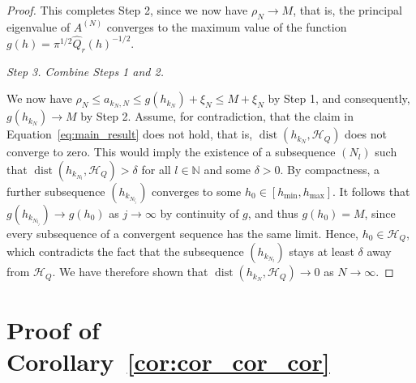 \begin{proof}
    This completes Step 2, since we now have $\rho_N\to M$, that is, the principal eigenvalue of $A^{(N)}$ converges to the maximum value of the function $g(h)=\pi^{1/2}\hat{Q}_r(h)^{-1/2}$.

    \textit{Step 3. Combine Steps 1 and 2.}

    We now have $\rho_N\le a_{k_N,N}\le g(h_{k_N})+\xi_N\le M+\xi_N$ by Step 1, and consequently, $g(h_{k_N})\to M$ by Step 2. Assume, for contradiction, that the claim in Equation~\eqref{eq:main_result} does not hold, that is, $\operatorname{dist}(h_{k_N},\mathcal{H}_Q)$ does not converge to zero. This would imply the existence of a subsequence $(N_l)$ such that $\operatorname{dist}(h_{k_{N_l}},\mathcal{H}_Q)>\delta$ for all $l\in\mathbb{N}$ and some $\delta>0$. By compactness, a further subsequence $(h_{k_{N_{l_j}}})$ converges to some $h_0\in[h_{\min},h_{\max}]$. It follows that $g(h_{k_{N_{l_j}}})\to g(h_0)$ as $j\to\infty$ by continuity of $g$, and thus $g(h_0)=M$, since every subsequence of a convergent sequence has the same limit. Hence, $h_0\in\mathcal{H}_Q$, which contradicts the fact that the subsequence $(h_{k_{N_l}})$ stays at least $\delta$ away from $\mathcal{H}_Q$. We have therefore shown that $\operatorname{dist}(h_{k_N},\mathcal{H}_Q)\to0$ as $N\to\infty$.
\end{proof}


\section{Proof of Corollary~\ref{cor:cor_cor_cor}}\label{sec:proof_cor_cor_cor}

